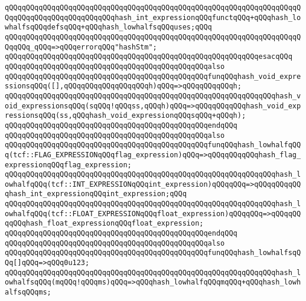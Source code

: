 \verb|qQQqqQQqqQQqqQQqqQQqqQQqqQQqqQQqqQQqqQQqqQQqqQQqqQQqqQQqqQQqqQQqqQQqqQQqqQQqqQQqqQQqqQQqqQQqqQQqhash_int_expressionqQQqfunctqQQq+qQQqhash_lowhalfsqQQqdefsqQQq+qQQqhash_lowhalfsqQQquses;qQQq|\newline
\newline
\verb|qQQqqQQqqQQqqQQqqQQqqQQqqQQqqQQqqQQqqQQqqQQqqQQqqQQqqQQqqQQqqQQqqQQqqQQqqQQq_qQQq=>qQQqerrorqQQq"hashStm";|\newline
\verb|qQQqqQQqqQQqqQQqqQQqqQQqqQQqqQQqqQQqqQQqqQQqqQQqqQQqqQQqqQQqesacqQQq|\newline
\newline
\verb|qQQqqQQqqQQqqQQqqQQqqQQqqQQqqQQqqQQqqQQqqQQqqQQqalso|\newline
\verb|qQQqqQQqqQQqqQQqqQQqqQQqqQQqqQQqqQQqqQQqqQQqqQQqfunqQQqhash_void_expressionsqQQq([],qQQqqQQqqQQqqQQqqQQqh)qQQq=>qQQqqQQqqQQqh;|\newline
\verb|qQQqqQQqqQQqqQQqqQQqqQQqqQQqqQQqqQQqqQQqqQQqqQQqqQQqqQQqqQQqqQQqhash_void_expressionsqQQq(sqQQq!qQQqss,qQQqh)qQQq=>qQQqqQQqqQQqhash_void_expressionsqQQq(ss,qQQqhash_void_expressionqQQqsqQQq+qQQqh);|\newline
\verb|qQQqqQQqqQQqqQQqqQQqqQQqqQQqqQQqqQQqqQQqqQQqqQQqendqQQq|\newline
\newline
\verb|qQQqqQQqqQQqqQQqqQQqqQQqqQQqqQQqqQQqqQQqqQQqqQQqalso|\newline
\verb|qQQqqQQqqQQqqQQqqQQqqQQqqQQqqQQqqQQqqQQqqQQqqQQqfunqQQqhash_lowhalfqQQq(tcf::FLAG_EXPRESSIONqQQqflag_expression)qQQq=>qQQqqQQqqQQqhash_flag_expressionqQQqflag_expression;|\newline
\verb|qQQqqQQqqQQqqQQqqQQqqQQqqQQqqQQqqQQqqQQqqQQqqQQqqQQqqQQqqQQqqQQqhash_lowhalfqQQq(tcf::INT_EXPRESSIONqQQqint_expression)qQQqqQQq=>qQQqqQQqqQQqhash_int_expressionqQQqint_expression;qQQq|\newline
\verb|qQQqqQQqqQQqqQQqqQQqqQQqqQQqqQQqqQQqqQQqqQQqqQQqqQQqqQQqqQQqqQQqhash_lowhalfqQQq(tcf::FLOAT_EXPRESSIONqQQqfloat_expression)qQQqqQQq=>qQQqqQQqqQQqhash_float_expressionqQQqfloat_expression;|\newline
\verb|qQQqqQQqqQQqqQQqqQQqqQQqqQQqqQQqqQQqqQQqqQQqqQQqendqQQq|\newline
\newline
\verb|qQQqqQQqqQQqqQQqqQQqqQQqqQQqqQQqqQQqqQQqqQQqqQQqalso|\newline
\verb|qQQqqQQqqQQqqQQqqQQqqQQqqQQqqQQqqQQqqQQqqQQqqQQqfunqQQqhash_lowhalfsqQQq[]qQQq=>qQQq0u123;|\newline
\verb|qQQqqQQqqQQqqQQqqQQqqQQqqQQqqQQqqQQqqQQqqQQqqQQqqQQqqQQqqQQqqQQqhash_lowhalfsqQQq(mqQQq!qQQqms)qQQq=>qQQqhash_lowhalfqQQqmqQQq+qQQqhash_lowhalfsqQQqms;|\newline
